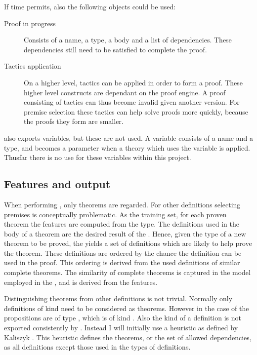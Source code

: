 If time permits, also the following objects could be used:
\begin{description}
    \item[Proof in progress]
        Consists of a name, a type, a body and a list of dependencies.
        These dependencies still need to be satisfied to complete the proof.
    \item[Tactics application]
        On a higher level, tactics can be applied in order to form a proof.
        These higher level constructs are dependant on the proof engine.
        A proof consisting of tactics can thus become invalid given another \coq version.
        For premise selection these tactics can help solve proofs more quickly, because the proofs they form are smaller.
\end{description}

\coq also exports variables, but these are not used.
A variable consists of a name and a type, and becomes a parameter when a theory which uses the variable is applied.
Thusfar there is no use for these variables within this project.

\subsection{Features and output}
When performing \premiseselection, only theorems are regarded.
For other definitions selecting premises is conceptually problematic.
As the training set, for each proven theorem the features are computed from the type.
The definitions used in the body of a theorem are the desired result of the \premiseselection.
Hence, given the type of a new theorem to be proved, the \premiseselection yields a set of definitions which are likely to help prove the theorem.
These definitions are ordered by the chance the definition can be used in the proof.
This ordering is derived from the used definitions of similar complete theorems.
The similarity of complete theorems is captured in the model employed in the \premiseselection, and is derived from the features.

Distinguishing theorems from other definitions is not trivial.
Normally only definitions of kind \prop need to be considered as theorems.
However in the case of \corn the propositions are of type \cprop, which is of kind \kindtype.
Also the kind of a definition is not exported consistently by \coq.
Instead I will initially use a heuristic as defined by Kaliszyk \cite{kaliszyk2014machine}.
This heuristic defines the theorems, or the set of allowed dependencies, as all definitions except those used in the types of definitions.

